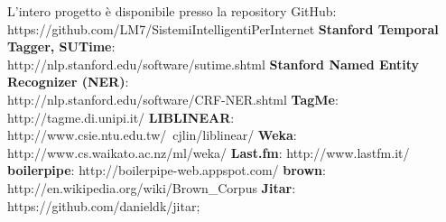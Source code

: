 \documentclass[a4paper]{report}
\begin{document}
\begin{thebibliography}{n}
\addto\captions{\renewcommand{\thebibliography}{Riferimenti}}
 L'intero progetto è disponibile presso la repository GitHub: \\https://github.com/LM7/SistemiIntelligentiPerInternet
 \textbf{Stanford Temporal Tagger, SUTime}: \\http://nlp.stanford.edu/software/sutime.shtml
 \textbf{Stanford Named Entity Recognizer (NER)}: \\http://nlp.stanford.edu/software/CRF-NER.shtml
 \textbf{TagMe}: http://tagme.di.unipi.it/
 \textbf{LIBLINEAR}: http://www.csie.ntu.edu.tw/~cjlin/liblinear/
 \textbf{Weka}: http://www.cs.waikato.ac.nz/ml/weka/
 \textbf{Last.fm}: http://www.lastfm.it/
 \textbf{boilerpipe}: http://boilerpipe-web.appspot.com/
 \textbf{brown}: http://en.wikipedia.org/wiki/Brown\_Corpus
 \textbf{Jitar}: https://github.com/danieldk/jitar;
\end{thebibliography}
\end{document}
